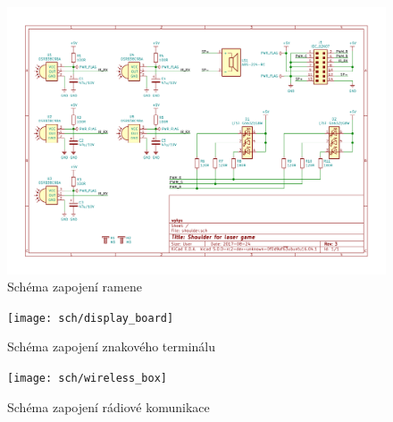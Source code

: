 \begin{landscape}
    \begin{figure}[h]
	    \centering
	    \includegraphics[height=\textwidth]{sch/shoulder}
	    \caption{Schéma zapojení ramene}
    \end{figure}
\end{landscape}

\begin{landscape}
    \begin{figure}[h]
	    \centering
	    \texttt{[image: sch/display\_board]}
	    \caption{Schéma zapojení znakového terminálu}
    \end{figure}
\end{landscape}

\begin{landscape}
    \begin{figure}[h]
	    \centering
	    \texttt{[image: sch/wireless\_box]}
	    \caption{Schéma zapojení rádiové komunikace}
    \end{figure}
\end{landscape}

